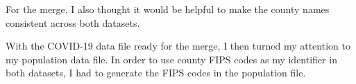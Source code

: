 \documentclass[
]{article}
\newenvironment{Shaded}{\begin{snugshade}}{\end{snugshade}}
\newcommand{\KeywordTok}[1]{\textcolor[rgb]{0.13,0.29,0.53}{\textbf{#1}}}
\newcommand{\NormalTok}[1]{#1}
\newcommand{\OperatorTok}[1]{\textcolor[rgb]{0.81,0.36,0.00}{\textbf{#1}}}
\newcommand{\StringTok}[1]{\textcolor[rgb]{0.31,0.60,0.02}{#1}}
\begin{document}
For the merge, I also thought it would be helpful to make the county
names consistent across both datasets.

\begin{Shaded}
\end{Shaded}

With the COVID-19 data file ready for the merge, I then turned my
attention to my population data file. In order to use county FIPS codes
as my identifier in both datasets, I had to generate the FIPS codes in
the population file.
\end{document}
